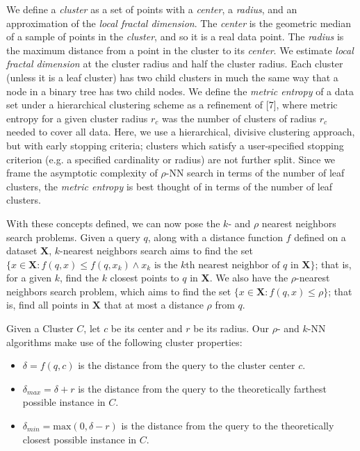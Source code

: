 We define a \emph{cluster} as a set of points with a \emph{center}, a \emph{radius}, and an approximation of the \emph{local fractal dimension}.
The \emph{center} is the geometric median of a sample of points in the \emph{cluster}, and so it is a real data point. The \emph{radius} is the
maximum distance from a point in the cluster to its \emph{center}. We estimate \emph{local fractal dimension} at the cluster radius and half
the cluster radius. Each cluster (unless it is a leaf cluster) has two child clusters in much the same way that a node in
a binary tree has two child nodes. We define the \emph{metric entropy} of a data set under a hierarchical clustering scheme as a refinement of [7], where
metric entropy for a given cluster radius $r_c$ was the number of clusters of radius $r_c$ needed to cover all data. Here, we use a hierarchical, divisive clustering 
approach, but with early stopping criteria; clusters which satisfy a user-specified stopping criterion (e.g. a specified cardinality or radius) are not further split. 
Since we frame the asymptotic complexity of $\rho$-NN search in terms of the number of leaf clusters, the \emph{metric entropy} is best thought of in terms of the number of
leaf clusters. 


With these concepts defined, we can now pose the $k$- and $\rho$ nearest neighbors search problems.
Given a query $q$, along with a distance function $f$ defined on a dataset $\textbf{X}$, $k$-nearest neighbors search aims to find 
the set $\{x \in \textbf{X}: f(q, x) \leq f(q, x_k) \land x_k \text{ is the $k$th nearest neighbor of $q$ in $\textbf{X}$}\}$; that is,
for a given $k$, find the $k$ closest points to $q$ in $ \textbf{X}$.
We also have the $\rho$-nearest neighbors search problem, which aims to find the set $\{x \in \textbf{X}: f(q, x) \leq \rho \}$; that is, 
find all points in $\textbf{X}$ that at most a distance $\rho$ from $q$.

Given a Cluster $C$, let $c$ be its center and $r$ be its radius. Our $\rho$- and $k$-NN algorithms make use of the following cluster 
properties:
\begin{itemize}
    \item $\delta = f(q, c)$ is the distance from the query to the cluster center $c$.
    \item $\delta_{max} = \delta + r$ is the distance from the query to the theoretically farthest possible instance in $C$.
    \item $\delta_{min} = \text{max}(0, \delta - r)$ is the distance from the query to the theoretically closest possible instance in $C$.
\end{itemize}


